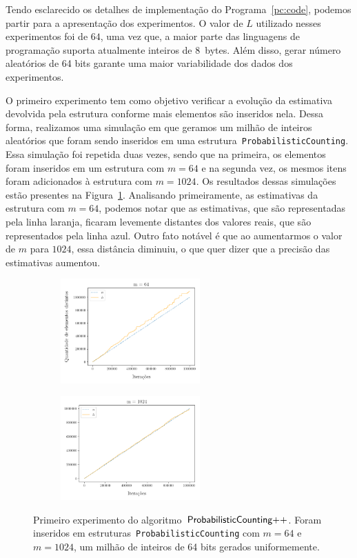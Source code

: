 Tendo esclarecido os detalhes de implementação do Programa~\ref{pc:code}, podemos partir para a apresentação dos 
experimentos. O valor de $L$ utilizado nesses experimentos foi de $64$, uma vez que, a maior parte das linguagens de 
programação suporta atualmente inteiros de $8$~bytes. Além disso, gerar número aleatórios de 64 bits garante uma maior
variabilidade dos dados dos experimentos. 

O primeiro experimento tem como objetivo verificar a evolução da estimativa devolvida pela estrutura 
conforme mais elementos são inseridos nela. Dessa forma, realizamos uma simulação em que geramos um milhão de inteiros 
aleatórios que foram sendo inseridos em uma estrutura~\texttt{ProbabilisticCounting}. Essa simulação foi repetida duas 
vezes, sendo que na primeira, os elementos foram inseridos em um estrutura com $m = 64$ e na segunda vez, os mesmos 
itens foram adicionados à estrutura com $m = 1024$. Os resultados dessas simulações estão presentes na 
Figura~\ref{fig:pc:experimento:01}. Analisando primeiramente, as estimativas da estrutura com $m = 64$, podemos notar 
que as estimativas, que são representadas pela linha laranja, ficaram levemente distantes dos valores reais, que são 
representados pela linha azul. Outro fato notável é que ao aumentarmos o valor de $m$ para $1024$, essa distância 
diminuiu, o que quer dizer que a precisão das estimativas aumentou.

\begin{figure}
  \centering
  \begin{subfigure}{.5\textwidth}
    \centering
    \includegraphics[width=\linewidth, height=4cm]{figuras/probabilistic_counting_full_64.png}
  \end{subfigure}%
  \begin{subfigure}{.5\textwidth}
    \centering
    \captionsetup{justification=centering}
    \includegraphics[width=\textwidth, height=4cm]{figuras/probabilistic_counting_full_1024.png}
  \end{subfigure}
  \caption{Primeiro experimento do algoritmo~$\textsf{ProbabilisticCounting{++}}$. Foram inseridos em estruturas~\texttt{ProbabilisticCounting} com 
  $m = 64$ e $m = 1024$, um milhão de inteiros de 64 bits gerados uniformemente.}
  \label{fig:pc:experimento:01}
\end{figure}


